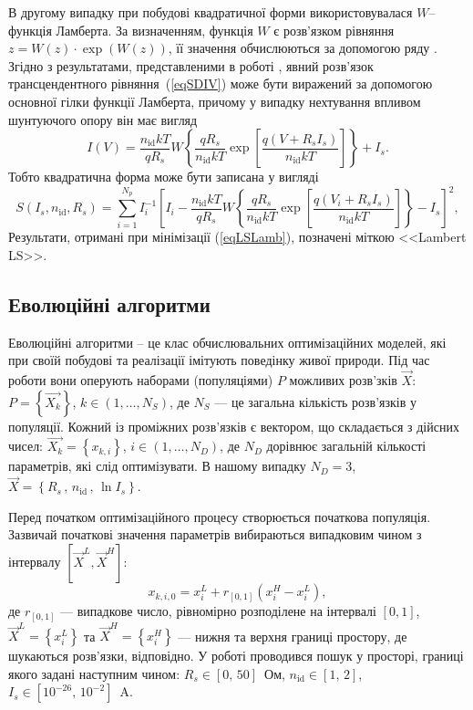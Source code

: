 В другому випадку при побудові квадратичної форми використовувалася $W$--функція Ламберта.
За визначенням, функція $W$ є розв'язком рівняння $z=W(z)\cdot\exp(W(z))$, її значення обчислюються за допомогою ряду \cite{LambertBook}.
Згідно з результатами, представленими в роботі \cite{Lambert_Jung}, явний розв'язок  трансцендентного рівняння~(\ref{eqSDIV}) може бути виражений за допомогою основної гілки функції Ламберта, причому у випадку нехтування впливом шунтуючого опору він має вигляд
\begin{equation}
\label{eqLam}
    I(V)=\frac{n_\mathrm{id}kT}{qR_s}W\left\{\frac{qR_s}{n_\mathrm{id}kT}
      \exp\left[\frac{q(V+R_sI_s)}{n_\mathrm{id}kT}\right]  \right\}+I_s.
\end{equation}
Тобто квадратична форма може бути записана у вигляді
\begin{equation}
\label{eqLSLamb}
S(I_s,n_\mathrm{id},R_s)=\sum_{i=1}^{N_p}I_i^{-1}\left[I_i-\frac{n_\mathrm{id}kT}{qR_s}W\left\{\frac{qR_s}{n_\mathrm{id}kT}
      \exp\left[\frac{q(V_i+R_sI_s)}{n_\mathrm{id}kT}\right]  \right\}-I_s\right]^2,
\end{equation}
Результати, отримані при мінімізації (\ref{eqLSLamb}), позначені міткою <<Lambert LS>>.


\subsection{Еволюційні алгоритми\label{subEA}}
Еволюційні алгоритми -- це клас обчислювальних оптимізаційних моделей, які при своїй побудові та реалізації імітують поведінку живої природи.
Під час роботи вони оперують наборами (популяціями) $P$ можливих розв'зків
$\overrightarrow{X}$: $P=\left\{\overrightarrow{X_k}\right\}$, $k\in(1,\ldots, N_S)$,
де $N_S$ --- це загальна кількість розв'язків у популяції.
Кожний із проміжних розв'язків є вектором, що складається з дійсних чисел:
$\overrightarrow{X_k}=\left\{x_{k,i}\right\}$, $i\in(1,\ldots, N_D)$,
де
$N_D$ дорівнює загальній кількості параметрів, які слід оптимізувати.
В нашому випадку $N_D=3$, $\overrightarrow{X}=\left\{R_s\,,\,n_\mathrm{id}\,,\,\ln I_s\right\}$.

Перед початком оптимізаційного процесу створюється початкова популяція.
Зазвичай початкові значення параметрів вибираються випадковим чином з інтервалу
$[\overrightarrow{X}^{L}, \overrightarrow{X}^{H}]$:
\begin{equation}
\label{eqEAIn}
x_{k,i,0}=x_i^L+r_{[0,1]}(x_i^H-x_i^L),
\end{equation}
де
$r_{[0,1]}$ --- випадкове число, рівномірно розподілене на інтервалі $[0,1]$,
$\overrightarrow{X}^{L}=\left\{x_i^L\right\}$ та $\overrightarrow{X}^{H}=\left\{x_i^H\right\}$ ---
нижня та верхня границі простору, де шукаються розв'язки, відповідно.
У роботі проводився пошук у просторі, границі якого задані наступним чином:
$R_s\in[0,\,50]$~Ом, $n_\mathrm{id}\in[1,\,2]$, $I_s\in[10^{-26},\,10^{-2}]$~A.

